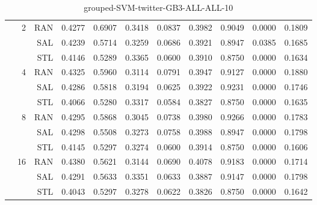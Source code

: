 \begin{center}
\begin{table}[htbp]
\begin{center}
\begin{tabular}{ | r | r | r | r | r | r | r | r | r | r | r |}
 & \multirow{3}{*}{2} & RAN & 0.4277 & 0.6907 & 0.3418 & 0.0837 & 0.3982 & 0.9049 & 0.0000 & 0.1809\\ \cline{3-11}
 &   & SAL & 0.4239 & 0.5714 & 0.3259 & 0.0686 & 0.3921 & 0.8947 & 0.0385 & 0.1685\\ \cline{3-11}
 &   & STL & 0.4146 & 0.5289 & 0.3365 & 0.0600 & 0.3910 & 0.8750 & 0.0000 & 0.1634\\ \cline{2-11}
 & \multirow{3}{*}{4} & RAN & 0.4325 & 0.5960 & 0.3114 & 0.0791 & 0.3947 & 0.9127 & 0.0000 & 0.1880\\ \cline{3-11}
 &   & SAL & 0.4286 & 0.5818 & 0.3194 & 0.0625 & 0.3922 & 0.9231 & 0.0000 & 0.1746\\ \cline{3-11}
 &   & STL & 0.4066 & 0.5280 & 0.3317 & 0.0584 & 0.3827 & 0.8750 & 0.0000 & 0.1635\\ \cline{2-11}
 & \multirow{3}{*}{8} & RAN & 0.4295 & 0.5868 & 0.3045 & 0.0738 & 0.3980 & 0.9266 & 0.0000 & 0.1783\\ \cline{3-11}
 &   & SAL & 0.4298 & 0.5508 & 0.3273 & 0.0758 & 0.3988 & 0.8947 & 0.0000 & 0.1798\\ \cline{3-11}
 &   & STL & 0.4145 & 0.5297 & 0.3274 & 0.0600 & 0.3914 & 0.8750 & 0.0000 & 0.1606\\ \cline{2-11}
 & \multirow{3}{*}{16} & RAN & 0.4380 & 0.5621 & 0.3144 & 0.0690 & 0.4078 & 0.9183 & 0.0000 & 0.1714\\ \cline{3-11}
 &   & SAL & 0.4291 & 0.5633 & 0.3351 & 0.0633 & 0.3887 & 0.9147 & 0.0000 & 0.1798\\ \cline{3-11}
 &   & STL & 0.4043 & 0.5297 & 0.3278 & 0.0622 & 0.3826 & 0.8750 & 0.0000 & 0.1642\\ \cline{2-11}
\hline
\end{tabular}
\caption{grouped-SVM-twitter-GB3-ALL-ALL-10}
\end{center}
 \end{table}
\end{center}


